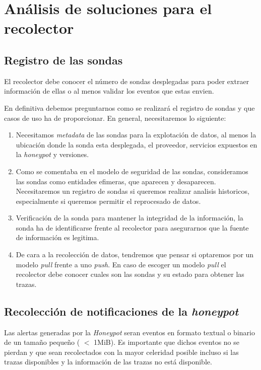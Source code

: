 \section{Análisis de soluciones para el recolector}


\subsection{Registro de las sondas}

El recolector debe conocer el número de sondas desplegadas para poder extraer información de ellas o al menos validar
los eventos que estas envien.

En definitiva debemos preguntarnos como se realizará el registro de sondas y que casos de uso ha de proporcionar. En general, necesitaremos lo siguiente:

\begin{enumerate}
    \item Necesitamos \emph{metadata} de las sondas para la explotación de datos, al menos la ubicación donde la sonda esta desplegada, el proveedor, servicios expuestos en la \emph{honeypot} y versiones.
    \item Como se comentaba en el modelo de seguridad de las sondas, consideramos las sondas como entidades efimeras, que aparecen y desaparecen. 
    Necesitaremos un registro de sondas si queremos realizar analisis historicos, especialmente si queremos permitir el reprocesado de datos.
    \item Verificación de la sonda para mantener la integridad de la información, la sonda ha de identificarse frente al recolector para asegurarnos que la fuente de información es legitima.
    \item De cara a la recolección de datos, tendremos que pensar si optaremos por un modelo \emph{pull} frente a uno \emph{push}. En caso de escoger un modelo \emph{pull} el recolector debe conocer
    cuales son las sondas y su estado para obtener las trazas.
\end{enumerate}

\subsection{Recolección de notificaciones de la \emph{honeypot}}

Las alertas generadas por la \emph{Honeypot} seran eventos en formato textual o binario de un tamaño pequeño ( $<$ 1MiB). 
Es importante que dichos eventos no se pierdan y que sean recolectados con la mayor celeridad posible incluso si las trazas disponibles
y la información de las trazas no está disponible.

